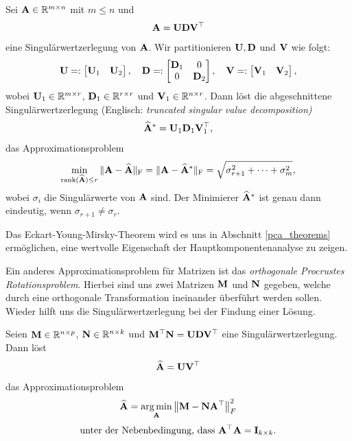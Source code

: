 \begin{thm}
Sei $\mathbf{A} \in \mathbb{R}^{m \times n}$ mit $m \leq n$ und 
$$\mathbf{A} = \mathbf{U}\mathbf{D} \mathbf{V}^{\top}$$
eine Singulärwertzerlegung von $\mathbf{A}$. Wir partitionieren $\mathbf{U}, \mathbf{D}$ und $\mathbf{V}$ wie folgt:
$$\mathbf{U} =: \begin{bmatrix} \mathbf{U}_1 & \mathbf{U}_2\end{bmatrix}, \quad 
\mathbf{D} =: \begin{bmatrix} \mathbf{D}_1 & 0 \\ 0 & \mathbf{D}_2 \end{bmatrix},\quad \mathbf{V} =: \begin{bmatrix} \mathbf{V}_1 & \mathbf{V}_2 \end{bmatrix},$$
wobei $\mathbf{U}_{1} \in \mathbb{R}^{m\times r}$, $\mathbf{D} _{1} \in \mathbb{R}^{r\times r}$ und $\mathbf{V}_{1} \in \mathbb{R}^{n\times r}$. Dann löst die abgeschnittene Singulärwertzerlegung (Englisch: \textit{truncated singular value decomposition)}
$$\widehat{\mathbf{A}}^* = \mathbf{U}_1 \mathbf{D}_1 \mathbf{V}_1^{\top},$$
das Approximationsproblem
\begin{align}
\min_{\operatorname{rank}(\widehat{\mathbf{A}}) \leq r} \|\mathbf{A}-\widehat{\mathbf{A}}\|_{\text{F}} = \|\mathbf{A}-\widehat{\mathbf{A}}^*\|_{\text{F}} = \sqrt{\sigma^2_{r+1} + \cdots + \sigma^2_m},
\end{align}
wobei $\sigma_i$ die Singulärwerte von $\mathbf{A}$ sind. Der Minimierer $\widehat{\mathbf{A}}^*$ ist genau dann eindeutig, wenn $\sigma_{r+1} \neq \sigma_{r}$.
\end{thm}

Das Eckart-Young-Mirsky-Theorem wird es uns in Abschnitt \ref{pca_theorems} ermöglichen, eine wertvolle Eigenschaft der Hauptkomponentenanalyse zu zeigen.

Ein anderes Approximationsproblem für Matrizen ist das \textit{orthogonale Procrustes Rotationsproblem}. Hierbei sind uns zwei Matrizen $\mathbf{M}$ und $\mathbf{N}$ gegeben, welche durch eine orthogonale Transformation ineinander überführt werden sollen. Wieder hilft uns die Singulärwertzerlegung bei der Findung einer Lösung.

\begin{thm}
Seien $\mathbf{M} \in \mathbb{R}^{n \times p}$, $\mathbf{N} \in \mathbb{R}^{n \times k}$ und $\mathbf{M}^{\top} \mathbf{N} = \mathbf{U}\mathbf{D} \mathbf{V}^{\top}$ eine Singulärwertzerlegung. Dann löst
$$\widehat{\mathbf{A}} = \mathbf{U} \mathbf{V}^{\top}$$
das Approximationsproblem
\begin{align}
\label{procrustes_rotation}
\widehat{\mathbf{A}} = \operatorname*{arg\,min}_{\mathbf{A}} \left\lVert \mathbf{M} - \mathbf{N} \mathbf{A}^{\top} \right\rVert_F^2
\end{align}
$$\text{unter der Nebenbedingung, dass } \mathbf{A}^{\top} \mathbf{A} = \mathbf{I}_{k \times k}.$$
\end{thm}

